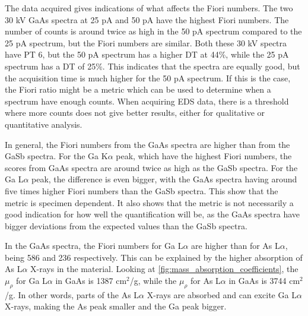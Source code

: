 The data acquired gives indications of what affects the Fiori numbers.
The two 30 kV GaAs spectra at 25 pA and 50 pA have the highest Fiori numbers.
The number of counts is around twice as high in the 50 pA spectrum compared to the 25 pA spectrum, but the Fiori numbers are similar.
Both these 30 kV spectra have PT 6, but the 50 pA spectrum has a higher DT at 44\%, while the 25 pA spectrum has a DT of 25\%.
This indicates that the spectra are equally good, but the acquisition time is much higher for the 50 pA spectrum.
If this is the case, the Fiori ratio might be a metric which can be used to determine when a spectrum have enough counts.
When acquiring EDS data, there is a threshold where more counts does not give better results, either for qualitative or quantitative analysis.


In general, the Fiori numbers from the GaAs spectra are higher than from the GaSb spectra.
For the Ga K$\alpha$ peak, which have the highest Fiori numbers, the scores from GaAs spectra are around twice as high as the GaSb spectra.
For the Ga L$\alpha$ peak, the difference is even bigger, with the GaAs spectra having around five times higher Fiori numbers than the GaSb spectra.
This show that the metric is specimen dependent.
It also shows that the metric is not necessarily a good indication for how well the quantification will be, as the GaAs spectra have bigger deviations from the expected values than the GaSb spectra.



In the GaAs spectra, the Fiori numbers for Ga L$\alpha$ are higher than for As L$\alpha$, being 586 and 236 respectively.
This can be explained by the higher absorption of As L$\alpha$ X-rays in the material. 
Looking at \cref{fig:mass_absorption_coefficients}, the $\mu_\rho$ for Ga L$\alpha$ in GaAs is 1387 cm$^2$/g, while the $\mu_\rho$ for As L$\alpha$ in GaAs is 3744 cm$^2$/g.
In other words, parts of the As L$\alpha$ X-rays are absorbed and can excite Ga L$\alpha$ X-rays, making the As peak smaller and the Ga peak bigger.


